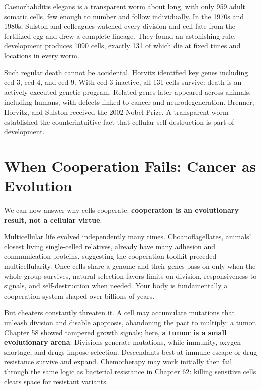 \begin{zhengju}
Caenorhabditis elegans is a transparent worm about  long, with only 959 adult somatic cells, few enough to number and follow individually. In the 1970s and 1980s, Sulston and colleagues watched every division and cell fate from the fertilized egg and drew a complete lineage. They found an astonishing rule: development produces 1090 cells, exactly 131 of which die at fixed times and locations in every worm.

Such regular death cannot be accidental. Horvitz identified key genes including ced-3, ced-4, and ced-9. With ced-3 inactive, all 131 cells survive: death is an actively executed genetic program. Related genes later appeared across animals, including humans, with defects linked to cancer and neurodegeneration. Brenner, Horvitz, and Sulston received the 2002 Nobel Prize. A transparent worm established the counterintuitive fact that cellular self-destruction is part of development.
\end{zhengju}

\section{When Cooperation Fails: Cancer as Evolution}

We can now answer why cells cooperate: \textbf{cooperation is an evolutionary result, not a cellular virtue}.

Multicellular life evolved independently many times. Choanoflagellates, animals' closest living single-celled relatives, already have many adhesion and communication proteins, suggesting the cooperation toolkit preceded multicellularity. Once cells share a genome and their genes pass on only when the whole group survives, natural selection favors limits on division, responsiveness to signals, and self-destruction when needed. Your body is fundamentally a cooperation system shaped over billions of years.

But cheaters constantly threaten it. A cell may accumulate mutations that unleash division and disable apoptosis, abandoning the pact to multiply: a tumor. Chapter 58 showed tampered growth signals; here, \textbf{a tumor is a small evolutionary arena}. Divisions generate mutations, while immunity, oxygen shortage, and drugs impose selection. Descendants best at immune escape or drug resistance survive and expand. Chemotherapy may work initially then fail through the same logic as bacterial resistance in Chapter 62: killing sensitive cells clears space for resistant variants.

